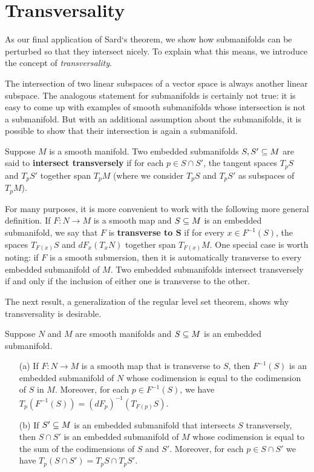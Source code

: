 \section{Transversality}
As our final application of Sard‘s theorem, we show how submanifolds can be perturbed so that they intersect nicely. To explain what this means, we introduce the
concept of \textit{transversality}.\par
The intersection of two linear subspaces of a vector space is always another linear subspace. The analogous statement for submanifolds is certainly not true: it is easy to come up with examples of smooth submanifolds whose intersection is not a submanifold. But with an additional assumption about the submanifolds, it is possible to show that their intersection is again a submanifold.\par
Suppose $M$ is a smooth manifold. Two embedded submanifolds $S,S'\subseteq M$ are said to \textbf{intersect transversely} if for each $p\in S\cap S'$, the tangent spaces $T_pS$ and $T_pS'$ together span $T_pM$ (where we consider $T_pS$ and $T_pS'$ as subspaces of $T_pM$).\par
For many purposes, it is more convenient to work with the following more general definition. If $F:N\to M$ is a smooth map and $S\subseteq M$ is an embedded submanifold,
we say that $F$ is \textbf{transverse to $\bm{S}$} if for every $x\in F^{-1}(S)$, the spaces $T_{F(x)}S$ and $dF_x(T_xN)$ together span $T_{F(x)}M$. One special case is worth noting: if $F$ is a smooth submersion, then it is automatically transverse to every embedded submanifold of $M$. Two embedded submanifolds intersect transversely if and only if the inclusion of either one is transverse to the other.\par
The next result, a generalization of the regular level set theorem, shows why transversality is desirable.
\begin{theorem}\label{transverse intersection preimage subm}
Suppose $N$ and $M$ are smooth manifolds and $S\subseteq M$ is an embedded submanifold.
\begin{itemize}
\item[(a)]If $F:N\to M$ is a smooth map that is transverse to $S$, then $F^{-1}(S)$ is an embedded submanifold of $N$ whose codimension is equal to the codimension of $S$ in $M$. Moreover, for each $p\in F^{-1}(S)$, we have $T_p(F^{-1}(S))=(dF_p)^{-1}(T_{F(p)}S)$.
\item[(b)]If $S'\subseteq M$ is an embedded submanifold that intersects $S$ transversely, then $S\cap S'$ is an embedded submanifold of $M$ whose codimension is equal to the sum of the codimensions of $S$ and $S'$. Moreover, for each $p\in S\cap S'$ we have $T_{p}(S\cap S')=T_pS\cap T_{p}S'$.
\end{itemize}
\end{theorem}
